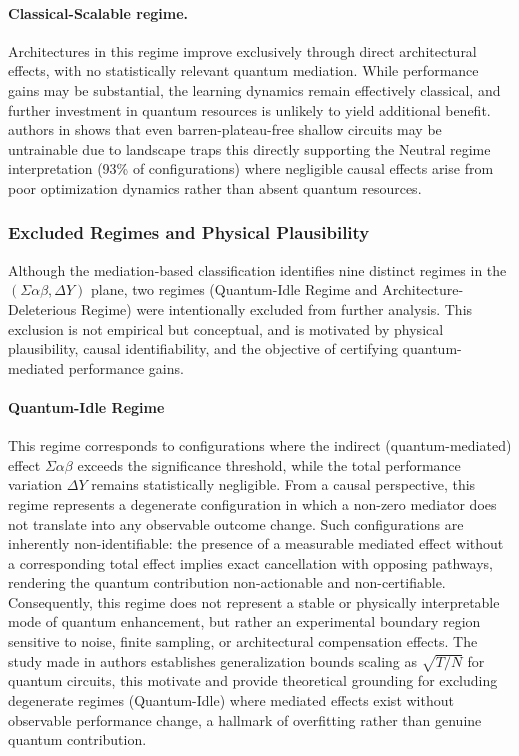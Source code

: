 \documentclass[
    reprint,
    amsmath, amssymb,
    aps,
    floatfix,
    nofootinbib
]{revtex4-1}
\begin{document}
\paragraph{Classical-Scalable regime.}
Architectures in this regime improve exclusively through direct architectural effects, with no statistically relevant quantum mediation. While performance gains may be substantial, the learning dynamics remain effectively classical, and further investment in quantum resources is unlikely to yield additional benefit. authors in \cite{anschuetz2022quantum} shows that even barren-plateau-free shallow circuits may be untrainable due to landscape traps this directly supporting the Neutral regime interpretation (93\% of configurations) where negligible causal effects arise from poor optimization dynamics rather than absent quantum resources.

\subsubsection{Excluded Regimes and Physical Plausibility}

Although the mediation-based classification identifies nine distinct regimes in the $(\Sigma\alpha\beta, \Delta Y)$ plane, two regimes (Quantum-Idle Regime and Architecture-Deleterious Regime) were intentionally excluded from further analysis. This exclusion is not empirical but conceptual, and is motivated by physical plausibility, causal identifiability, and the objective of certifying quantum-mediated performance gains.

\paragraph{Quantum-Idle Regime}
This regime corresponds to configurations where the indirect (quantum-mediated) effect $\Sigma\alpha\beta$ exceeds the significance threshold, while the total performance variation $\Delta Y$ remains statistically negligible. From a causal perspective, this regime represents a degenerate configuration in which a non-zero mediator does not translate into any observable outcome change. Such configurations are inherently non-identifiable: the presence of a measurable mediated effect without a corresponding total effect implies exact cancellation with opposing pathways, rendering the quantum contribution non-actionable and non-certifiable. Consequently, this regime does not represent a stable or physically interpretable mode of quantum enhancement, but rather an experimental boundary region sensitive to noise, finite sampling, or architectural compensation effects. The study made in \cite{caro2022generalization} authors  establishes generalization bounds scaling as $\sqrt{T/N}$ for quantum circuits, this motivate and  provide theoretical grounding for excluding degenerate regimes (Quantum-Idle) where mediated effects exist without observable performance change, a hallmark of overfitting rather than genuine quantum contribution.
\end{document}
